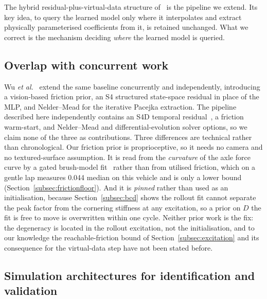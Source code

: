 The hybrid residual-plus-virtual-data structure of~\cite{ontrack2025} is the
pipeline we extend. Its key idea, to query the learned model only where it
interpolates and extract physically parameterised coefficients from it, is
retained unchanged. What we correct is the mechanism deciding \emph{where} the
learned model is queried.

\subsection{Overlap with concurrent work}

Wu \emph{et al.}~\cite{visionsysid2026} extend the same baseline concurrently
and independently, introducing a vision-based friction prior, an S4 structured
state-space residual in place of the MLP, and Nelder--Mead for the iterative
Pacejka extraction. The pipeline described here independently contains an S4D
temporal residual~\cite{gu2022s4d,gu2022s4}, a friction warm-start, and
Nelder--Mead and differential-evolution solver options, so we claim none of the
three as contributions. Three differences are technical rather than
chronological. Our friction prior is proprioceptive, so it needs no camera and
no textured-surface assumption. It is read from the \emph{curvature} of the
axle force curve by a gated brush-model
fit~\cite{fiala1954,acosta2017friction} rather than from utilised friction,
which on a gentle lap measures \num{0.044} median on this vehicle and is only a
lower bound (Section~\ref{subsec:frictionfloor}). And it is \emph{pinned}
rather than used as an initialisation, because Section~\ref{subsec:bcd} shows
the rollout fit cannot separate the peak factor from the cornering stiffness at
any excitation, so a prior on $D$ the fit is free to move is overwritten within
one cycle. Neither prior work is the fix: the degeneracy is located in the
rollout excitation, not the initialisation, and to our knowledge the
reachable-friction bound of Section~\ref{subsec:excitation} and its consequence
for the virtual-data step have not been stated before.

\subsection{Simulation architectures for identification and validation}

